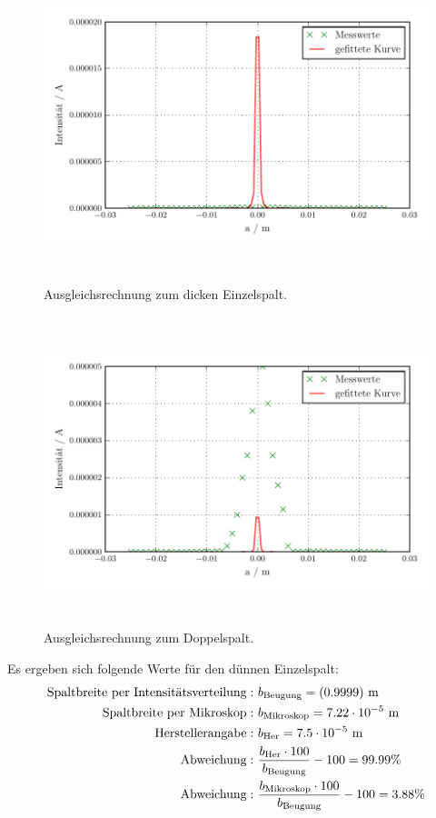 \begin{figure}[H] %
  \centering
  \includegraphics[height=9cm]{build/plot1.pdf}
  \caption{Ausgleichsrechnung zum dicken Einzelspalt.}
  \label{fig:Einzel3}
\end{figure}

\begin{figure}[H] %
  \centering
  \includegraphics[height=9cm]{build/plot4.pdf}
  \caption{Ausgleichsrechnung zum Doppelspalt.}
  \label{fig:Doppel}
\end{figure}

Es ergeben sich folgende Werte für den dünnen Einzelspalt:
\begin{align*}
  \text{Spaltbreite per Intensitätsverteilung}:& \ b_\text{Beugung} = (\num{0.9999 +- 0.0}) \ \text{m} \\
  \text{Spaltbreite per Mikroskop}:& \ b_\text{Mikroskop} = 7.22 \cdot 10^{-5} \ \text{m} \\
  \text{Herstellerangabe}:& \ b_\text{Her} = 7.5 \cdot 10^{-5} \ \text{m} \\
  \text{Abweichung}:& \ \frac{b_\text{Her} \cdot 100}{b_\text{Beugung}} - 100 = 99.99 \% \\
  \text{Abweichung}:& \ \frac{b_\text{Mikroskop} \cdot 100}{b_\text{Beugung}} - 100 = 3.88 \%
\end{align*}

